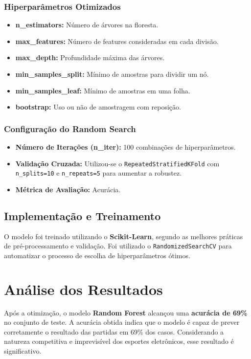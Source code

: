 \documentclass[a4paper,times,12pt]{article}
\begin{document}
\subsubsection*{Hiperparâmetros Otimizados}
\begin{itemize}
  \item \textbf{n\_estimators:} Número de árvores na floresta.
  \item \textbf{max\_features:} Número de features consideradas em cada divisão.
  \item \textbf{max\_depth:} Profundidade máxima das árvores.
  \item \textbf{min\_samples\_split:} Mínimo de amostras para dividir um nó.
  \item \textbf{min\_samples\_leaf:} Mínimo de amostras em uma folha.
  \item \textbf{bootstrap:} Uso ou não de amostragem com reposição.
\end{itemize}

\subsubsection*{Configuração do Random Search}
\begin{itemize}
  \item \textbf{Número de Iterações (n\_iter):} 100 combinações de hiperparâmetros.
  \item \textbf{Validação Cruzada:} Utilizou-se o \texttt{RepeatedStratifiedKFold} com \texttt{n\_splits=10} e \texttt{n\_repeats=5} para aumentar a robustez.
  \item \textbf{Métrica de Avaliação:} Acurácia.
\end{itemize}

\subsection{Implementação e Treinamento}

\hspace{+15pt}
O modelo foi treinado utilizando o \textbf{Scikit-Learn}, segundo as melhores práticas de pré-processamento e validação. Foi utilizado o \texttt{RandomizedSearchCV} para automatizar o processo de escolha de hiperparâmetros ótimos.

\section{Análise dos Resultados}
\hspace{+15pt}
Após a otimização, o modelo \textbf{Random Forest} alcançou uma \textbf{acurácia de 69\%} no conjunto de teste.
A acurácia obtida indica que o modelo é capaz de prever corretamente o resultado das partidas em 69\% dos casos. Considerando a natureza competitiva e imprevisível dos esportes eletrônicos, esse resultado é significativo.
\end{document}
